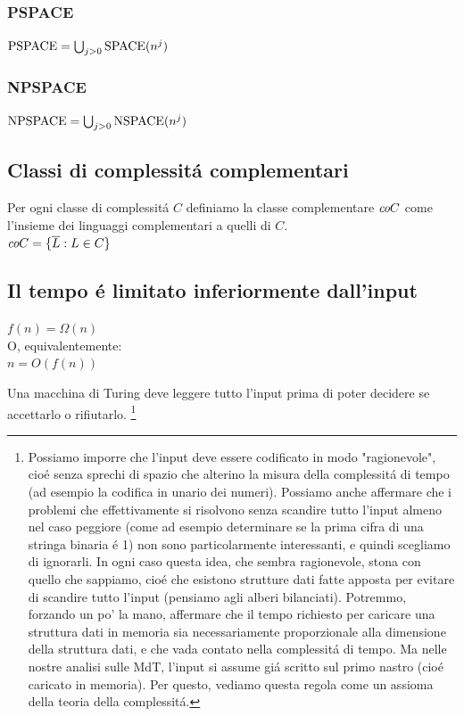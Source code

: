 \subsubsection{PSPACE}
$\text{PSPACE} = \bigcup_{j>0} \text{SPACE}(n^j)$
\subsubsection{NPSPACE}
$\text{NPSPACE} = \bigcup_{j>0} \text{NSPACE}(n^j)$

\subsection{Classi di complessitá complementari}
Per ogni classe di complessitá $C$ definiamo la classe complementare $\textit{co} C$ come l'insieme dei linguaggi complementari a quelli di $C$. \\
$\textit{co} C = \{ \overline{L} : L \in C \}$


\subsection{Il tempo é limitato inferiormente dall'input}
\label{teorema:tempo_limitato_inferiormente_dall_input}
{$f(n) = \Omega(n)$} \\
O, equivalentemente: \\
{$n = O(f(n))$}

Una macchina di Turing deve leggere tutto l'input prima di poter decidere se accettarlo o rifiutarlo.
\footnote{Possiamo imporre che l'input deve essere codificato in modo "ragionevole", 
cioé senza sprechi di spazio che alterino la misura della complessitá di tempo 
(ad esempio la codifica in unario dei numeri).
Possiamo anche affermare che i problemi che effettivamente si risolvono 
senza scandire tutto l'input almeno nel caso peggiore 
(come ad esempio determinare se la prima cifra di una stringa binaria é 1)
non sono particolarmente interessanti, e quindi scegliamo di ignorarli.
In ogni caso questa idea, che sembra ragionevole, stona con quello che sappiamo, 
cioé che esistono strutture dati fatte apposta per evitare di scandire tutto l'input 
(pensiamo agli alberi bilanciati).
Potremmo, forzando un po' la mano, affermare che il tempo richiesto per caricare una struttura dati in memoria
sia necessariamente proporzionale alla dimensione della struttura dati, e che vada contato nella complessitá di tempo.
Ma nelle nostre analisi sulle MdT, l'input si assume giá scritto sul primo nastro (cioé caricato in memoria).
Per questo, vediamo questa regola come un assioma della teoria della complessitá.
}


